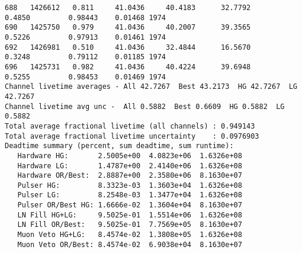 \documentclass[notitlepage,rmp,aps,10pt]{revtex4-1}
\begin{document}
\begin{verbatim}
688   1426612   0.811     41.0436     40.4183      32.7792        0.4850         0.98443    0.01468 1974
690   1425750   0.979     41.0436     40.2007      39.3565        0.5226         0.97913    0.01461 1974
692   1426981   0.510     41.0436     32.4844      16.5670        0.3248         0.79112    0.01185 1974
696   1425731   0.982     41.0436     40.4224      39.6948        0.5255         0.98453    0.01469 1974
Channel livetime averages - All 42.7267  Best 43.2173  HG 42.7267  LG 42.7267
Channel livetime avg unc -  All 0.5882  Best 0.6609  HG 0.5882  LG 0.5882
Total average fractional livetime (all channels) : 0.949143
Total average fractional livetime uncertainty    : 0.0976903
Deadtime summary (percent, sum deadtime, sum runtime):
   Hardware HG:       2.5005e+00  4.0823e+06  1.6326e+08
   Hardware LG:       1.4787e+00  2.4140e+06  1.6326e+08
   Hardware OR/Best:  2.8887e+00  2.3580e+06  8.1630e+07
   Pulser HG:         8.3323e-03  1.3603e+04  1.6326e+08
   Pulser LG:         8.2548e-03  1.3477e+04  1.6326e+08
   Pulser OR/Best HG: 1.6666e-02  1.3604e+04  8.1630e+07
   LN Fill HG+LG:     9.5025e-01  1.5514e+06  1.6326e+08
   LN Fill OR/Best:   9.5025e-01  7.7569e+05  8.1630e+07
   Muon Veto HG+LG:   8.4574e-02  1.3808e+05  1.6326e+08
   Muon Veto OR/Best: 8.4574e-02  6.9038e+04  8.1630e+07


\end{verbatim}
\end{document}
